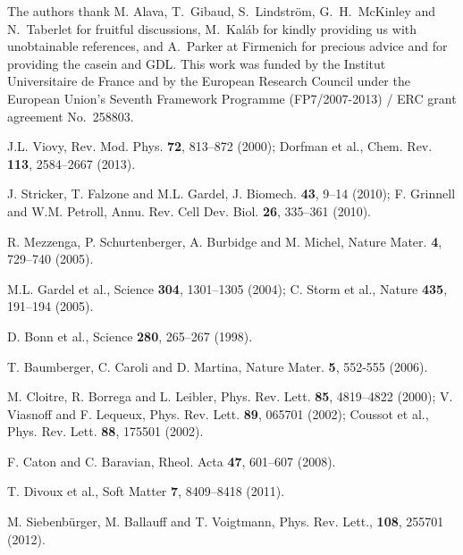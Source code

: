 \documentclass[twocolumn,superscriptaddress,showpacs,preprintnumbers,amsmath,amssymb,prl]{revtex4}
\begin{document}
\begin{acknowledgments}
The authors thank M. Alava, T.~Gibaud, S.~Lindstr\"om, G.~H.~McKinley and N.~Taberlet for fruitful discussions, M.~Kal\'ab for kindly providing us with unobtainable references, and A.~Parker at Firmenich for precious advice and for providing the casein and GDL. This work was funded by the Institut Universitaire de France and by the European Research Council under the European Union's Seventh Framework Programme (FP7/2007-2013) / ERC grant agreement No.~258803. 
\end{acknowledgments}

\begin{thebibliography}{}

 J.L. Viovy, Rev. Mod. Phys. {\bf 72}, 813--872 (2000); Dorfman et al., Chem. Rev. {\bf 113}, 2584--2667 (2013).

 J. Stricker, T. Falzone and M.L. Gardel, J. Biomech. {\bf 43},  9--14 (2010); F. Grinnell and W.M. Petroll, Annu. Rev. Cell Dev. Biol. {\bf 26}, 335--361 (2010).

 R. Mezzenga, P. Schurtenberger, A. Burbidge and M. Michel, Nature Mater.  {\bf 4}, 729--740 (2005).

 M.L. Gardel et al., Science {\bf 304}, 1301--1305 (2004); C. Storm et al., Nature {\bf 435}, 191--194 (2005).

 D. Bonn et al., Science {\bf 280}, 265--267 (1998).

 T. Baumberger, C. Caroli and D. Martina, Nature Mater. {\bf 5}, 552-555 (2006).



 M. Cloitre, R. Borrega and L. Leibler, Phys. Rev. Lett. {\bf 85}, 4819--4822 (2000); V. Viasnoff and F. Lequeux, Phys. Rev. Lett. {\bf 89}, 065701 (2002); Coussot et al., Phys. Rev. Lett. {\bf 88}, 175501 (2002).

 F. Caton and C. Baravian, Rheol. Acta {\bf 47}, 601--607 (2008).

 T. Divoux et al., Soft Matter {\bf 7}, 8409--8418 (2011).

 M. Siebenb\"urger, M. Ballauff and T. Voigtmann, Phys. Rev.
Lett., {\bf 108}, 255701 (2012).


\end{thebibliography}
\end{document}
